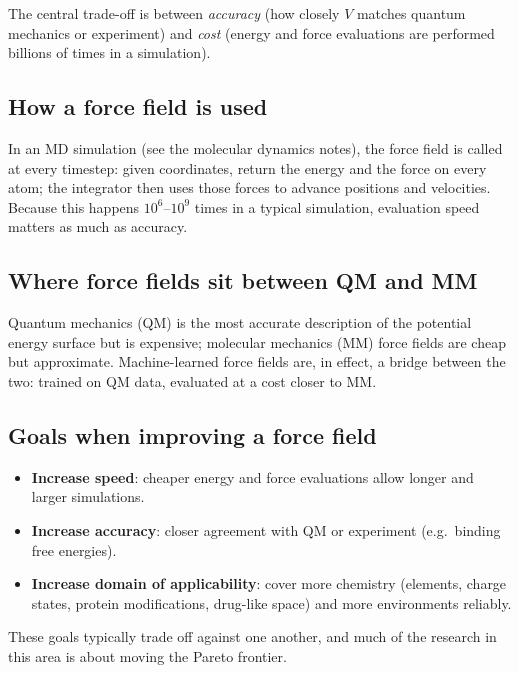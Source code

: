 \documentclass[english,course]{lecture}
\begin{document}
The central trade-off is between \emph{accuracy} (how closely $V$ matches quantum mechanics or experiment) and \emph{cost} (energy and force evaluations are performed billions of times in a simulation).

\subsection{How a force field is used}

In an MD simulation (see the molecular dynamics notes), the force field is called at every timestep: given coordinates, return the energy and the force on every atom; the integrator then uses those forces to advance positions and velocities. Because this happens $10^6$--$10^9$ times in a typical simulation, evaluation speed matters as much as accuracy.


\subsection{Where force fields sit between QM and MM}

Quantum mechanics (QM) is the most accurate description of the potential energy surface but is expensive; molecular mechanics (MM) force fields are cheap but approximate. Machine-learned force fields are, in effect, a bridge between the two: trained on QM data, evaluated at a cost closer to MM.

\subsection{Goals when improving a force field}

\begin{itemize}
    \item \textbf{Increase speed}: cheaper energy and force evaluations allow longer and larger simulations.
    \item \textbf{Increase accuracy}: closer agreement with QM or experiment (e.g.\ binding free energies).
    \item \textbf{Increase domain of applicability}: cover more chemistry (elements, charge states, protein modifications, drug-like space) and more environments reliably.
\end{itemize}
These goals typically trade off against one another, and much of the research in this area is about moving the Pareto frontier.
\end{document}
